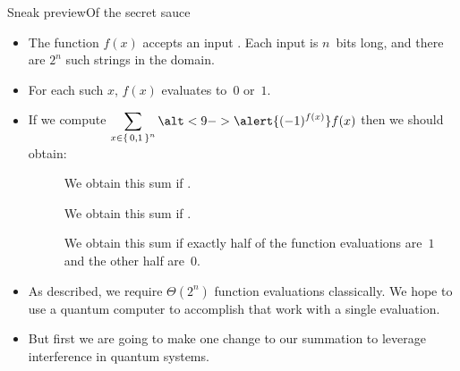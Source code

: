 \begin{frame}{Sneak preview}{Of the secret sauce}
\Vskip{-3.5em}\begin{itemize}[<+->]
    \item The function $f(x)$ accepts an input .  Each input is $n$~bits long, and \alert<10->{there are $2^n$ such strings} in the domain.
    \item For each such $x$, $f(x)$ evaluates to~$0$ or~$1$.  
    \item If we compute $\SumBV{x}{n} \alt<9->{\alert{\NegF{x}}}{f(x)}$ then we should obtain:
    \begin{description}
        \item[]  We obtain this sum if .
        \item[]  We obtain this sum if .
        \item[]  \textcolor<14->{\RCtwo}{We obtain this sum if exactly half of the function evaluations are~$1$ and the other half are~$0$.}
    \end{description}
    \item As described, we require $\Theta(2^n)$ function evaluations classically.  We hope to use a quantum computer to accomplish that work with a single evaluation.
    \item But first we are going to make \alert{one change} to our summation to leverage \textcolor<14->{\RCtwo}{interference} in quantum systems.
\end{itemize}
    
\end{frame}

